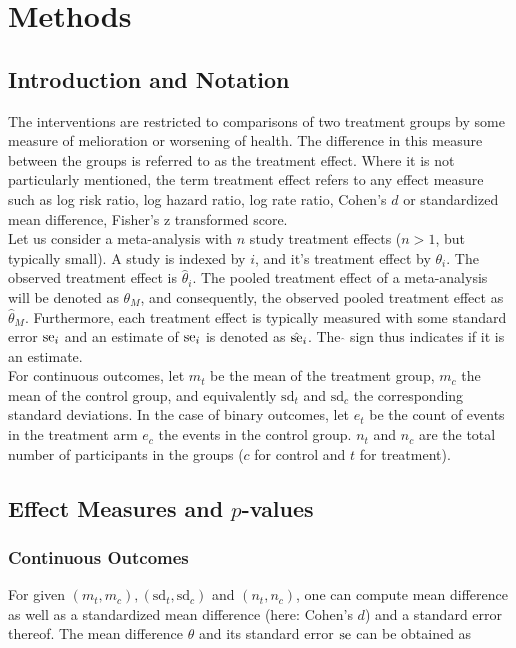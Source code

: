 \documentclass[11pt,a4paper,twoside]{book}\usepackage[]{graphicx}\usepackage[]{color}
\begin{document}




\chapter{Methods} \label{ch:methods}
\section{Introduction and Notation}
The interventions are restricted to comparisons of two treatment groups by some measure of melioration or worsening of health. The difference in this measure between the groups is referred to as the treatment effect. Where it is not particularly mentioned, the term treatment effect refers to any effect measure such as log risk ratio, log hazard ratio, log rate ratio, Cohen's $d$ or standardized mean difference, Fisher's z transformed score.\\
Let us consider a meta-analysis with $n$ study treatment effects ($n > 1$, but typically small). A study is indexed by $i$, and it's treatment effect by  $\theta_i$. The observed treatment effect is $\hat{\theta}_i$. The pooled treatment effect of a meta-analysis will be denoted as $\theta_M$, and consequently, the observed pooled treatment effect as $\hat{\theta}_M$. Furthermore, each treatment effect is typically measured with some standard error $\operatorname{se}_i$ and an estimate of $\operatorname{se}_i$ is denoted as $\hat{\operatorname{se}}_i$. The $\hat{}$ sign thus indicates if it is an estimate.\\
For continuous outcomes, let $m_t$ be the mean of the treatment group, $m_c$ the mean of the control group, and equivalently $\textrm{sd}_t$ and $\textrm{sd}_c$ the corresponding standard deviations. 
In the case of binary outcomes, let $e_t$ be the count of events in the treatment arm $e_c$ the events in the control group. $n_t$ and $n_c$ are the total number of participants in the groups ($c$ for control and $t$ for treatment).%

\section{Effect Measures and $p$\hspace{0.4mm}-values}
\subsection{Continuous Outcomes}
For given $(m_t, m_c), (\textrm{sd}_t, \textrm{sd}_c)$ and $(n_t, n_c)$, one can compute mean difference as well as a standardized mean difference (here: Cohen's $d$) and a standard error thereof.
The mean difference $\theta$ and its standard error $\operatorname{se}$ can be obtained as
\end{document}
